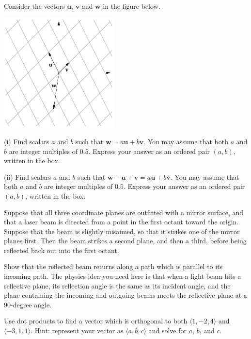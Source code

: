 \documentclass{watsonbook}
\begin{document}
\begin{aexercise}
  Consider the vectors $\mathbf{u}$, $\mathbf{v}$ and $\mathbf{w}$ in
  the figure below.

  \begin{center}
    \includegraphics[width=6cm]{exercisefigures/parallelogram}
  \end{center}

  (i) Find scalars $a$ and $b$ such that
  $\mathbf{w} = a\mathbf{u} + b\mathbf{v}$. You may assume that both $a$
  and $b$ are integer multiples of $0.5$. Express your answer as an
  ordered pair $(a,b)$, written in the box.

  (ii) Find scalars $a$ and $b$ such that
  $\mathbf{w} - \mathbf{u} + \mathbf{v} = a\mathbf{u} +
  b\mathbf{v}$. You may assume that both $a$ and $b$ are integer
  multiples of $0.5$. Express your answer as an ordered pair $(a,b)$,
  written in the box.
\end{aexercise}

\begin{aexercise}
  Suppose that all three coordinate planes are outfitted with a mirror
  surface, and that a laser beam is directed from a point in the first
  octant toward the origin. Suppose that the beam is slightly
  misaimed, so that it strikes one of the mirror planes first. Then
  the beam strikes a second plane, and then a third, before being
  reflected back out into the first octant.

  Show that the reflected beam returns along a path which is parallel
  to its incoming path. The physics idea you need here is that when a
  light beam hits a reflective plane, its reflection angle is the same
  as its incident angle, and the plane containing the incoming and
  outgoing beams meets the reflective plane at a 90-degree angle.
\end{aexercise}


\begin{aexercise}
  Use dot products to find a vector which is orthogonal to both
  $\langle 1, -2, 4 \rangle$ and $\langle -3, 1, 1 \rangle$. Hint:
  represent your vector as $\langle a, b, c \rangle$ and solve for
  $a$, $b$, and $c$. 
\end{aexercise}
\end{document}
